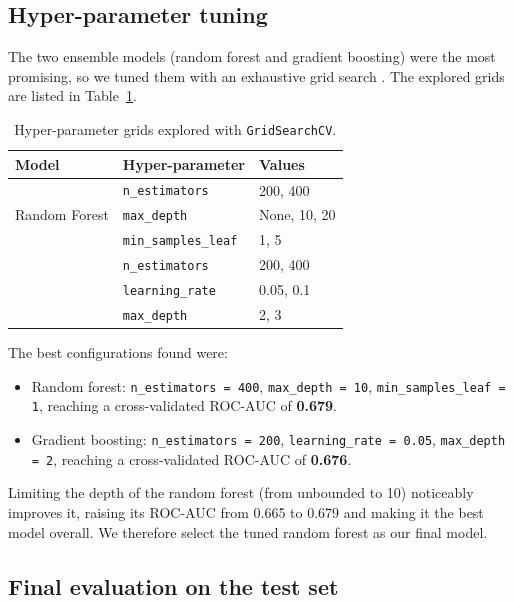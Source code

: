 \documentclass[11pt,a4paper]{article}
\begin{document}
\subsection{Hyper-parameter tuning}

The two ensemble models (random forest and gradient boosting) were the most promising,
so we tuned them with an exhaustive grid search . The explored grids are listed in
Table~\ref{tab:grids}.

\begin{table}[htbp]
\centering
\caption{Hyper-parameter grids explored with \texttt{GridSearchCV}.}
\label{tab:grids}
\footnotesize
\begin{tabular}{@{}lll@{}}
\toprule
\textbf{Model} & \textbf{Hyper-parameter} & \textbf{Values} \\
\midrule
\multirow{3}{*}{Random Forest}
 & \texttt{n\_estimators}      & 200, 400 \\
 & \texttt{max\_depth}         & None, 10, 20 \\
 & \texttt{min\_samples\_leaf} & 1, 5 \\
\addlinespace
\multirow{3}{*}{Gradient Boosting}
 & \texttt{n\_estimators}  & 200, 400 \\
 & \texttt{learning\_rate} & 0.05, 0.1 \\
 & \texttt{max\_depth}     & 2, 3 \\
\bottomrule
\end{tabular}
\end{table}

The best configurations found were:

\begin{itemize}
    \item Random forest: \texttt{n\_estimators = 400}, \texttt{max\_depth = 10}, \texttt{min\_samples\_leaf = 1}, reaching a cross-validated ROC-AUC of \textbf{0.679}.
    \item Gradient boosting: \texttt{n\_estimators = 200}, \texttt{learning\_rate = 0.05}, \texttt{max\_depth = 2}, reaching a cross-validated ROC-AUC of \textbf{0.676}.
\end{itemize}

Limiting the depth of the random forest (from unbounded to 10) noticeably improves it,
raising its ROC-AUC from 0.665 to 0.679 and making it the best model overall. We
therefore select the tuned random forest as our final model.

\subsection{Final evaluation on the test set}
\label{sec:final-eval}
\end{document}

